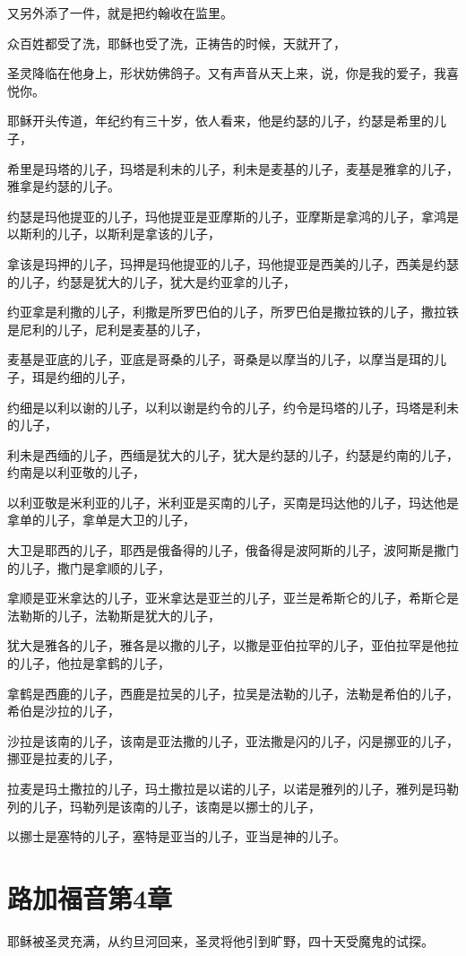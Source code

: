 \documentclass[12pt,oneside]{book}
\begin{document}
又另外添了一件，就是把约翰收在监里。

众百姓都受了洗，耶稣也受了洗，正祷告的时候，天就开了，

圣灵降临在他身上，形状妨佛鸽子。又有声音从天上来，说，你是我的爱子，我喜悦你。

耶稣开头传道，年纪约有三十岁，依人看来，他是约瑟的儿子，约瑟是希里的儿子，

希里是玛塔的儿子，玛塔是利未的儿子，利未是麦基的儿子，麦基是雅拿的儿子，雅拿是约瑟的儿子。

约瑟是玛他提亚的儿子，玛他提亚是亚摩斯的儿子，亚摩斯是拿鸿的儿子，拿鸿是以斯利的儿子，以斯利是拿该的儿子，

拿该是玛押的儿子，玛押是玛他提亚的儿子，玛他提亚是西美的儿子，西美是约瑟的儿子，约瑟是犹大的儿子，犹大是约亚拿的儿子，

约亚拿是利撒的儿子，利撒是所罗巴伯的儿子，所罗巴伯是撒拉铁的儿子，撒拉铁是尼利的儿子，尼利是麦基的儿子，

麦基是亚底的儿子，亚底是哥桑的儿子，哥桑是以摩当的儿子，以摩当是珥的儿子，珥是约细的儿子，

约细是以利以谢的儿子，以利以谢是约令的儿子，约令是玛塔的儿子，玛塔是利未的儿子，

利未是西缅的儿子，西缅是犹大的儿子，犹大是约瑟的儿子，约瑟是约南的儿子，约南是以利亚敬的儿子，

以利亚敬是米利亚的儿子，米利亚是买南的儿子，买南是玛达他的儿子，玛达他是拿单的儿子，拿单是大卫的儿子，

大卫是耶西的儿子，耶西是俄备得的儿子，俄备得是波阿斯的儿子，波阿斯是撒门的儿子，撒门是拿顺的儿子，

拿顺是亚米拿达的儿子，亚米拿达是亚兰的儿子，亚兰是希斯仑的儿子，希斯仑是法勒斯的儿子，法勒斯是犹大的儿子，

犹大是雅各的儿子，雅各是以撒的儿子，以撒是亚伯拉罕的儿子，亚伯拉罕是他拉的儿子，他拉是拿鹤的儿子，

拿鹤是西鹿的儿子，西鹿是拉吴的儿子，拉吴是法勒的儿子，法勒是希伯的儿子，希伯是沙拉的儿子，

沙拉是该南的儿子，该南是亚法撒的儿子，亚法撒是闪的儿子，闪是挪亚的儿子，挪亚是拉麦的儿子，

拉麦是玛土撒拉的儿子，玛土撒拉是以诺的儿子，以诺是雅列的儿子，雅列是玛勒列的儿子，玛勒列是该南的儿子，该南是以挪士的儿子，

以挪士是塞特的儿子，塞特是亚当的儿子，亚当是神的儿子。

\chapter{路加福音第4章}
耶稣被圣灵充满，从约旦河回来，圣灵将他引到旷野，四十天受魔鬼的试探。
\end{document}
